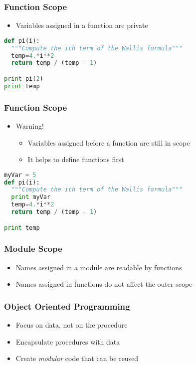 \documentclass[xcolor=table,10pt,final]{beamer}
\begin{document}
\begin{frame}[fragile]
  \frametitle{Function Scope}
  \begin{itemize}
    \item Variables assigned in a function are private
  \end{itemize}
\begin{lstlisting}[language=Python]
def pi(i):
  """Compute the ith term of the Wallis formula"""
  temp=4.*i**2
  return temp / (temp - 1)

print pi(2)
print temp
\end{lstlisting}
\end{frame}

\begin{frame}[fragile]
  \frametitle{Function Scope}
  \begin{itemize}
    \item Warning!
      \begin{itemize}
        \item Variables assigned before a function are still in scope
        \item It helps to define functions first
      \end{itemize}
  \end{itemize}
\begin{lstlisting}[language=Python]
myVar = 5
def pi(i):
  """Compute the ith term of the Wallis formula"""
  print myVar
  temp=4.*i**2
  return temp / (temp - 1)

print temp
\end{lstlisting}
\end{frame}

\begin{frame}[fragile]
  \frametitle{Module Scope}
  \begin{itemize}
    \item Names assigned in a module are readable by functions
    \item Names assigned in functions do not affect the outer scope
  \end{itemize}
\end{frame}

\begin{frame}
  \frametitle{Object Oriented Programming}
  \begin{itemize}
    \item Focus on data, not on the procedure
    \item Encapsulate procedures with data
    \item Create {\it modular} code that can be reused
  \end{itemize}
\end{frame}
\end{document}
